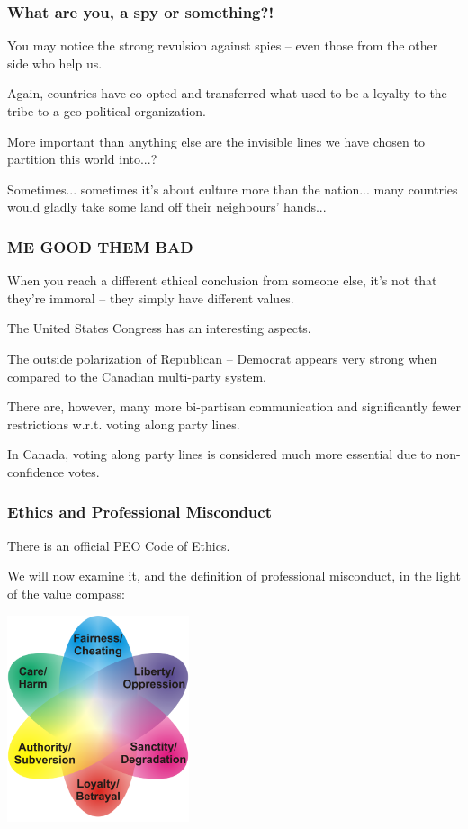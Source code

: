 \begin{frame}
\frametitle{What are you, a spy or something?!}


You may notice the strong revulsion against spies -- even those from the other side who help us.


Again, countries have co-opted and transferred what used to be a loyalty to the tribe to a geo-political organization.

More important than anything else are the invisible lines we have chosen to partition this world into...?

Sometimes... sometimes it's about culture more than the nation... many countries would gladly take some land off their neighbours' hands...
\end{frame}



\begin{frame}
\frametitle{ME GOOD THEM BAD}

When you reach a different ethical conclusion from someone else, it's not that they're immoral -- they simply have different values.

The United States Congress has an interesting aspects.

The outside polarization of Republican -- Democrat appears very strong when compared to the Canadian multi-party system.

There are, however, many more bi-partisan communication and significantly fewer restrictions w.r.t. voting along party lines.

In Canada, voting along party lines is considered much more essential due to non-confidence votes.


\end{frame}



\begin{frame}
\frametitle{Ethics and Professional Misconduct}

There is an official PEO Code of Ethics.

We will now examine it, and the definition of professional misconduct, in the light of the value compass:

\begin{center}
	\includegraphics[width=0.4\textwidth]{images/moralcompass}
\end{center}


\end{frame}





